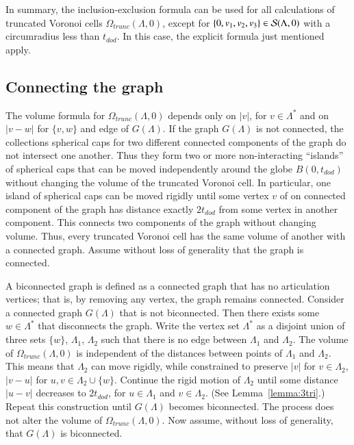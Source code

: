 \documentclass{article} %
\begin{document}
In summary, the inclusion-exclusion formula can be used for all
calculations of truncated Voronoi cells $\Omega_{trunc}(\Lambda,0)$,
except for $\{0,v_1,v_2,v_3\}\in {\mathcal S}(\Lambda,0)$ with
a circumradius less than $t_{dod}$.  In this case, 
the explicit formula just mentioned apply.

\subsection{Connecting the graph}

The volume formula for $\Omega_{trunc}(\Lambda,0)$ depends only on
$|v|$, for $v\in\Lambda^*$ and on $|v-w|$ for $\{v,w\}$ and edge of
$G(\Lambda)$. If the graph $G(\Lambda)$ is not connected, the
collections spherical caps for two different connected components of
the graph do not intersect one another. Thus they form two or more
non-interacting ``islands'' of spherical caps that can be moved
independently around the globe $B(0,t_{dod})$ without changing the
volume of the truncated Voronoi cell. In particular, one island of
spherical caps can be moved rigidly until some vertex $v$ of on
connected component of the graph has distance exactly $2t_{dod}$ from
some vertex in another component. This connects two components of the
graph without changing volume. Thus, every truncated Voronoi cell has
the same volume of another with a connected graph. Assume without loss
of generality that the graph is connected.

A biconnected graph is defined as a connected graph that has no
articulation vertices; that is, by removing any vertex, the graph
remains connected. Consider a connected graph $G(\Lambda)$ that is not
biconnected. Then there exists some $w\in \Lambda^*$ that disconnects
the graph. Write the vertex set $\Lambda^*$ as a disjoint union of
three sets $\{w\}$, $\Lambda_1$, $\Lambda_2$ such that there is no
edge between $\Lambda_1$ and $\Lambda_2$. The volume of
$\Omega_{trunc}(\Lambda,0)$ is independent of the distances between
points of $\Lambda_1$ and $\Lambda_2$. This means that $\Lambda_2$ can
move rigidly, while constrained to preserve $|v|$ for $v\in\Lambda_2$,
$|v-u|$ for $u,v\in \Lambda_2\cup\{w\}$. Continue the rigid motion of
$\Lambda_2$ until some distance $|u-v|$ decreases to $2t_{dod}$, for
$u\in\Lambda_1$ and $v\in\Lambda_2$. (See Lemma~\ref{lemma:3tri}.)
Repeat this construction until $G(\Lambda)$ becomes biconnected. The
process does not alter the volume of $\Omega_{trunc}(\Lambda,0)$. Now
assume, without loss of generality, that $G(\Lambda)$ is biconnected.
\end{document}
